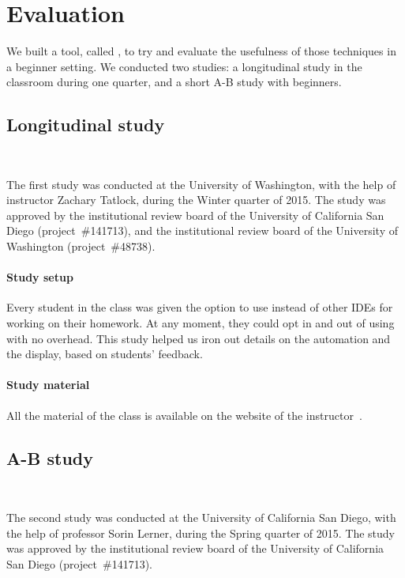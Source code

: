\section{Evaluation}

We built a tool, called \PeaCoq{}, to try and evaluate the usefulness of those
techniques in a beginner setting.  We conducted two studies: a longitudinal
study in the classroom during one quarter, and a short A-B study with beginners.

\subsection{Longitudinal study}~\label{peacoq-longitudinal-study}

The first study was conducted at the University of Washington, with the help of
instructor Zachary Tatlock, during the Winter quarter of 2015.  The study was
approved by the institutional review board of the University of California San
Diego (project~\#141713), and the institutional review board of the University
of Washington (project~\#48738).

\paragraph{Study setup}

Every student in the class was given the option to use \PeaCoq{} instead of
other IDEs for working on their homework.  At any moment, they could opt in and
out of using \PeaCoq{} with no overhead.  This study helped us iron out details
on the automation and the display, based on students' feedback.

\paragraph{Study material}

All the material of the class is available on the website of the
instructor~\footnotemark{}.



\subsection{A-B study}~\label{peacoq-a-b-study}

The second study was conducted at the University of California San Diego, with
the help of professor Sorin Lerner, during the Spring quarter of 2015.  The
study was approved by the institutional review board of the University of
California San Diego (project~\#141713).

